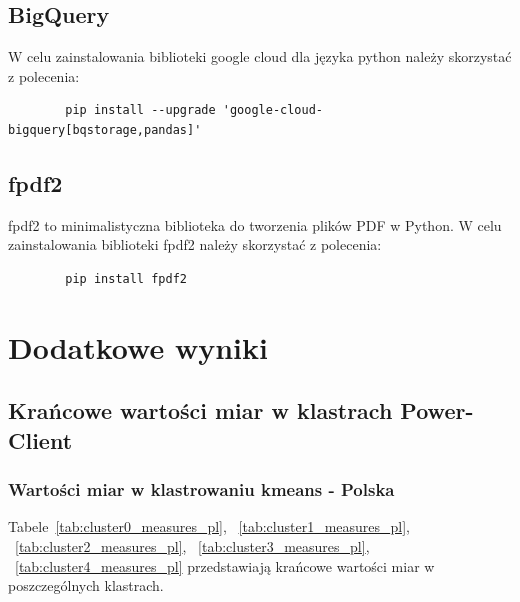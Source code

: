 \documentclass[11pt]{report}
\begin{document}
    \section{BigQuery}
    W celu zainstalowania biblioteki google cloud dla języka python należy skorzystać z polecenia:
    \begin{verbatim}
        pip install --upgrade 'google-cloud-bigquery[bqstorage,pandas]'
    \end{verbatim}


    \section{fpdf2}
    fpdf2 to minimalistyczna biblioteka do tworzenia plików PDF w Python.
    W celu zainstalowania biblioteki fpdf2 należy skorzystać z polecenia:
    \begin{verbatim}
        pip install fpdf2
    \end{verbatim}


    \chapter{Dodatkowe wyniki}


    \section{Krańcowe wartości miar w klastrach Power-Client}

    \subsection{Wartości miar w klastrowaniu kmeans - Polska}\label{subsec:wartości-miar-w-klastrowaniu-kmeans---polska}

    Tabele~\ref{tab:cluster0_measures_pl},
    ~\ref{tab:cluster1_measures_pl},
    ~\ref{tab:cluster2_measures_pl},
    ~\ref{tab:cluster3_measures_pl},
    ~\ref{tab:cluster4_measures_pl}
    przedstawiają krańcowe wartości miar w poszczególnych klastrach.
\end{document}
